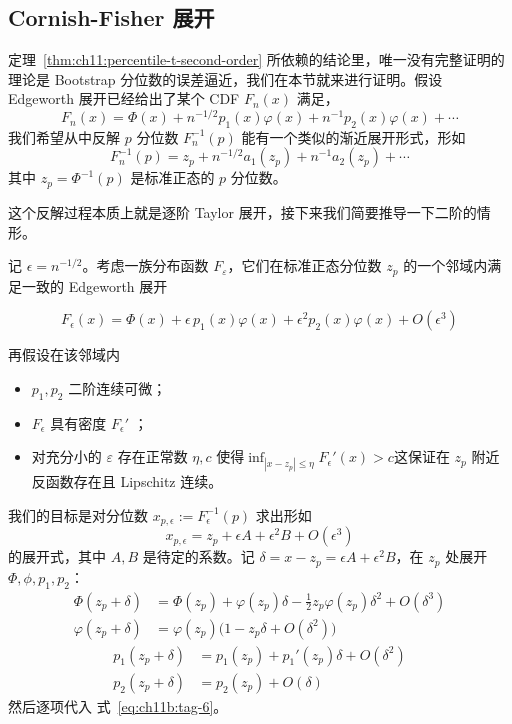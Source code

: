 \subsection{Cornish-Fisher 展开}
\label{sub:ch11b:cornish-fisher}

定理~\ref{thm:ch11:percentile-t-second-order} 所依赖的结论里，唯一没有完整证明的理论是 Bootstrap 分位数的误差逼近，我们在本节就来进行证明。假设 Edgeworth 展开已经给出了某个 CDF $F_n(x)$ 满足，
\[F_n(x)=\Phi(x)+n^{-1/2}p_1(x)\varphi(x)+n^{-1}p_2(x)\varphi(x)+\cdots\]
我们希望从中反解 $p$ 分位数 $F_n^{-1}(p)$ 能有一个类似的渐近展开形式，形如
\[F_n^{-1}(p)=z_p+n^{-1/2}a_1(z_p)+n^{-1}a_2(z_p)+\cdots\]
其中 $z_p=\Phi^{-1}(p)$ 是标准正态的 $p$ 分位数。

这个反解过程本质上就是逐阶 Taylor 展开，接下来我们简要推导一下二阶的情形。

记 $\epsilon = n^{-1/2}$。考虑一族分布函数 $F_\varepsilon$，它们在标准正态分位数 $z_p$ 的一个邻域内满足一致的 Edgeworth 展开

\begin{equation}
\label{eq:ch11b:tag-6}
F_\epsilon(x) = \Phi(x) + \epsilon\, p_1(x)\varphi(x) + \epsilon^2 p_2(x)\varphi(x) + O(\epsilon^3)
\end{equation}

再假设在该邻域内

\begin{itemize}
\tightlist
\item
  $p_1,p_2$ 二阶连续可微；
\item
  $F_\epsilon$ 具有密度 $F_\epsilon'$ ；
\item
  对充分小的 $\varepsilon$ 存在正常数 $\eta,c$ 使得$\inf_{|x-z_p|\le \eta} F_\epsilon'(x) > c$这保证在 $z_p$ 附近反函数存在且 Lipschitz 连续。
\end{itemize}

我们的目标是对分位数 $x_{p,\epsilon}:=F_\epsilon^{-1}(p)$ 求出形如
\[x_{p,\epsilon} = z_p + \epsilon A + \epsilon^2 B + O(\epsilon^3)\]
的展开式，其中 $A,B$ 是待定的系数。记 $\delta = x - z_p = \epsilon A + \epsilon^2 B$，在 $z_p$ 处展开 $\Phi,\phi,p_1,p_2$：
\[\begin{aligned} \Phi(z_p+\delta) &= \Phi(z_p) + \varphi(z_p)\delta - \frac12 z_p \varphi(z_p)\delta^2 + O(\delta^3)\\ \varphi(z_p+\delta) &= \varphi(z_p)\bigl(1 - z_p\delta + O(\delta^2)\bigr) \end{aligned}\]\[\begin{aligned} p_1(z_p+\delta) &= p_1(z_p) + p_1'(z_p)\delta + O(\delta^2) \\ p_2(z_p+\delta) &= p_2(z_p) + O(\delta) \end{aligned}\]
然后逐项代入 式~\eqref{eq:ch11b:tag-6}。


